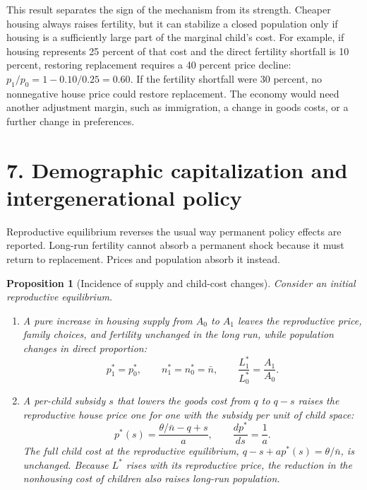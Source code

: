 \documentclass[11pt]{article}
\newtheorem{proposition}{Proposition}
\theoremstyle{definition}
\begin{document}
This result separates the sign of the mechanism from its strength. Cheaper
housing always raises fertility, but it can stabilize a closed population only
if housing is a sufficiently large part of the marginal child's cost. For
example, if housing represents 25 percent of that cost and the direct fertility
shortfall is 10 percent, restoring replacement requires a 40 percent price
decline: $p_1/p_0=1-0.10/0.25=0.60$. If the fertility shortfall were 30 percent,
no nonnegative house price could restore replacement. The economy would need
another adjustment margin, such as immigration, a change in goods costs, or a
further change in preferences.

\section*{7. Demographic capitalization and intergenerational policy}

Reproductive equilibrium reverses the usual way permanent policy effects are
reported. Long-run fertility cannot absorb a permanent shock because it must
return to replacement. Prices and population absorb it instead.

\begin{proposition}[Incidence of supply and child-cost changes]
\label{prop:capitalization}
Consider an initial reproductive equilibrium.
\begin{enumerate}
 \item A pure increase in housing supply from $A_0$ to $A_1$ leaves the
 reproductive price, family choices, and fertility unchanged in the long run,
 while population changes in direct proportion:
 \begin{equation}
  p_1^*=p_0^*,
  \qquad n_1^*=n_0^*=\bar n,
  \qquad \frac{L_1^*}{L_0^*}=\frac{A_1}{A_0}.
  \label{eq:supply_incidence}
 \end{equation}
 \item A per-child subsidy $s$ that lowers the goods cost from $q$ to $q-s$
 raises the reproductive house price one for one with the subsidy per unit of
 child space:
 \begin{equation}
  p^*(s)=\frac{\theta/\bar n-q+s}{a},
  \qquad \frac{dp^*}{ds}=\frac{1}{a}.
  \label{eq:subsidy_incidence}
 \end{equation}
 The full child cost at the reproductive equilibrium,
 $q-s+ap^*(s)=\theta/\bar n$, is unchanged.
 Because $L^*$ rises with its reproductive price, the reduction in the
 nonhousing cost of children also raises long-run population.
\end{enumerate}
\end{proposition}
\end{document}
